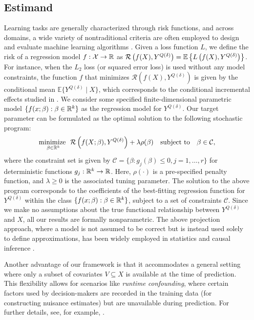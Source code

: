 \subsection{Estimand} \label{subsec:estimand}

Learning tasks are generally characterized through risk functions, and across domains, a wide variety of nontraditional criteria are often employed to design and evaluate machine learning algorithms \citep{wang2020comprehensive}. 
Given a loss function $L$, we define the risk of a regression model $f:\mathcal{X} \rightarrow \mathbb{R}$ as $\mathcal{R}\left( f(X), Y^{Q(\delta)} \right)=\mathbb{E}\left\{L\left(f(X), Y^{Q(\delta)} \right)\right\}$. For instance, when the $L_2$ loss (or squared error loss) is used without any model constraints, the function $f$ that minimizes $\mathcal{R}(f(X), Y^{Q(\delta)})$ is given by the conditional mean $\mathbb{E} \{ Y^{Q(\delta)} \mid X \}$, which corresponds to the conditional incremental effects studied in \citet{mcclean2024nonparametric}. We consider some specified finite-dimensional parametric model $\{f(x;\beta) : \beta \in \mathbb{R}^k\}$ as the regression model for $Y^{Q(\delta)}$. Our target parameter can be formulated as the optimal solution to the following stochastic program:
\begin{align} \label{eqn:target-program}
\underset{\beta \in \mathbb{R}^k}{\text{minimize }} \,\,  \mathcal{R}\left( f(X;\beta), Y^{Q(\delta)} \right) + \lambda \rho(\beta) \quad \text{subject to} \quad \beta \in \mathcal{C},  
\end{align}
where the constraint set is given by $\mathcal{C} = \{\beta : g_j(\beta) \leq 0, j=1,\ldots,r\}$ for deterministic functions $g_j:\mathbb{R}^k \rightarrow \mathbb{R}$. Here, $\rho(\cdot)$ is a pre-specified penalty function, and $\lambda \geq 0$ is the associated tuning parameter.
The solution to the above program corresponds to the coefficients of the best-fitting regression function for $Y^{Q(\delta)}$ within the class $\{f(x;\beta) : \beta \in \mathbb{R}^k\}$, subject to
a set of constraints $\mathcal{C}$. Since we make no assumptions about the true functional relationship between $Y^{Q(\delta)}$ and $X$, all our results are formally nonparametric. The above projection approach, where a model is not assumed to be correct but is instead used solely to define approximations, has been widely employed in statistics and causal inference \citep[see, for example,][Section 3.1.1]{kennedy2021semiparametric}.

\begin{remark}
    Another advantage of our framework is that it accommodates a general setting where only a subset of covariates $V \subseteq X$ is available at the time of prediction. This flexibility allows for scenarios like \emph{runtime confounding}, where certain factors used by decision-makers are recorded in the training data (for constructing nuisance estimates) but are unavailable during prediction. For further details, see, for example, \citet{coston2020RuntimeConfounding, kim2022counterfactual}.    
\end{remark}

